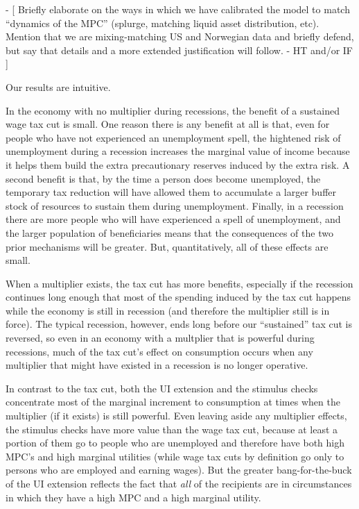 \documentclass[../HAFiscal]{subfiles}
\begin{document}
- [ Briefly elaborate on the ways in which we have calibrated the model to match ``dynamics of the MPC'' (splurge, matching liquid asset distribution, etc).  Mention that we are mixing-matching US and Norwegian data and briefly defend, but say that details and a more extended justification will follow. - HT and/or IF ]


Our results are intuitive.

In the economy with no multiplier during recessions, the benefit of a sustained wage tax cut is small.  One reason there is any benefit at all is that, even for people who have not experienced an unemployment spell, the hightened risk of unemployment during a recession increases the marginal value of income because it helps them build the extra precautionary reserves induced by the extra risk.  A second benefit is that, by the time a person does become unemployed, the temporary tax reduction will have allowed them to accumulate a larger buffer stock of resources to sustain them during unemployment.  Finally, in a recession there are more people who will have experienced a spell of unemployment, and the larger population of beneficiaries means that the consequences of the two prior mechanisms will be greater.  But, quantitatively, all of these effects are small.

When a multiplier exists, the tax cut has more benefits, especially if the recession continues long enough that most of the spending induced by the tax cut happens while the economy is still in recession (and therefore the multiplier still is in force).  The typical recession, however, ends long before our ``sustained'' tax cut is reversed, so even in an economy with a multplier that is powerful during recessions, much of the tax cut's effect on consumption occurs when any multiplier that might have existed in a recession is no longer operative.

In contrast to the tax cut, both the UI extension and the stimulus checks concentrate most of the marginal increment to consumption at times when the multiplier (if it exists) is still powerful.  Even leaving aside any multiplier effects, the stimulus checks have more value than the wage tax cut, because at least a portion of them go to people who are unemployed and therefore have both high MPC's and high marginal utilities (while wage tax cuts by definition go only to persons who are employed and earning wages).  But the greater bang-for-the-buck of the UI extension reflects the fact that \textit{all} of the recipients are in circumstances in which they have a high MPC and a high marginal utility.
\end{document}
